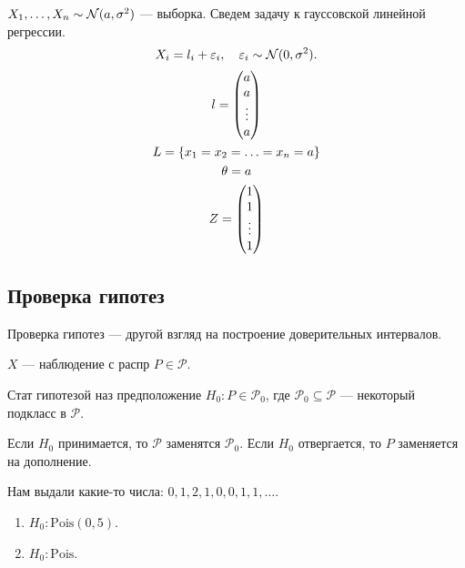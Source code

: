 \begin{example}
    \(X_1, \ldots, X_n \sim \mathcal{N}(a, \sigma^2)\) --- выборка. Сведем задачу к гауссовской линейной регрессии.
    \begin{displaymath}
        X_i = l_i + \varepsilon_i, \quad \varepsilon_i \sim \mathcal{N}(0, \sigma^2).
    \end{displaymath}
    \begin{gather*}
        l = \begin{pmatrix}
            a \\ a \\ \vdots \\ a
        \end{pmatrix} \\
        L = \left\{x_1 = x_2 = \ldots = x_n = a\right\} \\
        \theta = a \\
        Z = \begin{pmatrix}
            1 \\ 1 \\ \vdots \\ 1
        \end{pmatrix}
    \end{gather*}
\end{example}


\subsection{Проверка гипотез}
Проверка гипотез --- другой взгляд на построение доверительных интервалов.

\(X\) --- наблюдение с распр \(P \in \mathcal{P}\).
\begin{definition}
    Стат гипотезой наз предположение \(H_0: P \in \mathcal{P}_0\), где \(\mathcal{P}_0 \subseteq \mathcal{P}\) --- некоторый подкласс в \(\mathcal{P}\).

    Если \(H_0\) принимается, то \(\mathcal{P}\) заменятся \(\mathcal{P}_0\).
    Если \(H_0\) отвергается, то \(P\) заменяется на дополнение.
\end{definition}

\begin{example}
    Нам выдали какие-то числа: \(0, 1, 2, 1, 0, 0, 1, 1, \ldots\).

    \begin{enumerate}    
        \item \(H_0: \mathrm{Pois}(0, 5)\).
        \item \(H_0: \mathrm{Pois}\).
    \end{enumerate}
\end{example}

